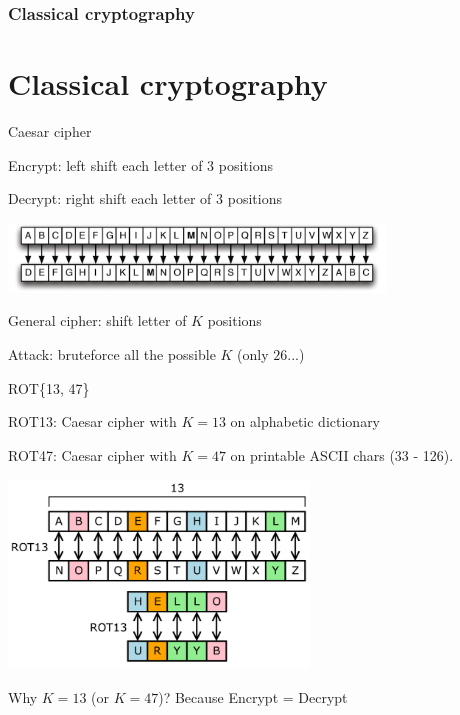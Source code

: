 \section[Section]{Classical cryptography}
\part{Classical cryptography}

\begin{frame}{Caesar cipher}

\centering

\smallskip

Encrypt: left shift each letter of 3 positions

\smallskip

Decrypt: right shift each letter of 3 positions

\medskip

\includegraphics[width=10cm]{img/caesar-shift.png}

\medskip

General cipher: shift letter of $K$ positions

\smallskip

Attack: bruteforce all the possible $K$ (only $26$...)

\end{frame}

\begin{frame}{ROT\{13, 47\}}

\centering

\medskip

ROT13: Caesar cipher with $K = 13$ on alphabetic dictionary

ROT47: Caesar cipher with $K = 47$ on printable ASCII chars (33 - 126).

\medskip

\includegraphics[width=8cm]{img/ROT13.png}

\medskip

Why $K = 13$ (or $K = 47$)? Because Encrypt = Decrypt

\end{frame}

